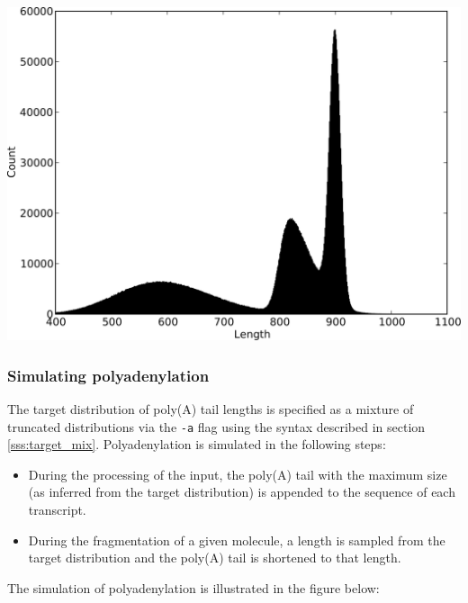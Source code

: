 \begin{center}
\includegraphics[scale=0.5]{pix/target_mix.png}
\end{center}

\subsubsection{Simulating polyadenylation}
\label{sss:polya_sim}

The target distribution of poly(A) tail lengths is specified as a mixture of truncated distributions via the {\tt -a} flag using the syntax described in section \ref{sss:target_mix}. Polyadenylation is simulated in the following steps:

\begin{itemize}
    \item During the processing of the input, the poly(A) tail with the maximum size (as inferred from the target distribution) is appended to the sequence of each transcript. 
    \item During the fragmentation of a given molecule, a length is sampled from the target distribution and the poly(A) tail is shortened to that length.
\end{itemize}

The simulation of polyadenylation is illustrated in the figure below:

